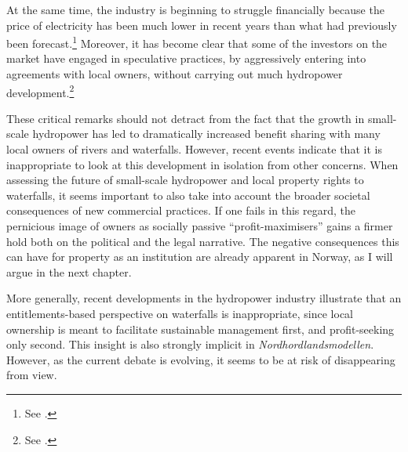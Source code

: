 At the same time, the industry is beginning to struggle financially because the price of electricity has been much lower in recent years than what had previously been forecast.\footnote{See \cite{sunde14}.} Moreover, it has become clear that some of the investors on the market have engaged in speculative practices, by aggressively entering into agreements with local owners, without carrying out much hydropower development.\footnote{See \cite{endresen14}.}

These critical remarks should not detract from the fact that the growth in small-scale hydropower has led to dramatically increased benefit sharing with many local owners of rivers and waterfalls. However, recent events indicate that it is inappropriate to look at this development in isolation from other concerns. When assessing the future of small-scale hydropower and local property rights to waterfalls, it seems important to also take into account the broader societal consequences of new commercial practices. If one fails in this regard, the pernicious image of owners as socially passive ``profit-maximisers'' gains a firmer hold both on the political and the legal narrative. The negative consequences this can have for property as an institution are already apparent in Norway, as I will argue in the next chapter. 

More generally, recent developments in the hydropower industry illustrate that an entitlements-based perspective on waterfalls is inappropriate, since local ownership is meant to facilitate sustainable management first, and profit-seeking only second. This insight is also strongly implicit in {\it Nordhordlandsmodellen}. However, as the current debate is evolving, it seems to be at risk of disappearing from view.


